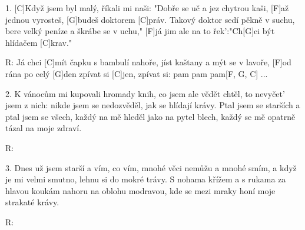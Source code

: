 
1. [C]Když jsem byl malý, říkali mi naši:
"Dobře se uč a jez chytrou kaši,
[F]až jednou vyrosteš, [G]budeš doktorem [C]práv.
Takový doktor sedí pěkně v suchu,
bere velký peníze a škrábe se v uchu,"
[F]já jim ale na to řek':"Ch[G]ci být hlídačem [C]krav."

R: Já chci [C]mít čapku s bambulí nahoře,
jíst kaštany a mýt se v lavoře,
[F]od rána po celý [G]den zpívat si [C]jen,
zpívat si: pam pam pam[F, G, C] ...

2. K vánocům mi kupovali hromady knih,
co jsem ale vědět chtěl, to nevyčet' jsem z nich:
nikde jsem se nedozvěděl, jak se hlídají krávy.
Ptal jsem se starších a ptal jsem se všech,
každý na mě hleděl jako na pytel blech,
každý se mě opatrně tázal na moje zdraví.

R:

3. Dnes už jsem starší a vím, co vím,
mnohé věci nemůžu a mnohé smím,
a když je mi velmi smutno, lehnu si do mokré trávy.
S nohama křížem a s rukama za hlavou
koukám nahoru na oblohu modravou,
kde se mezi mraky honí moje strakaté krávy.

R: